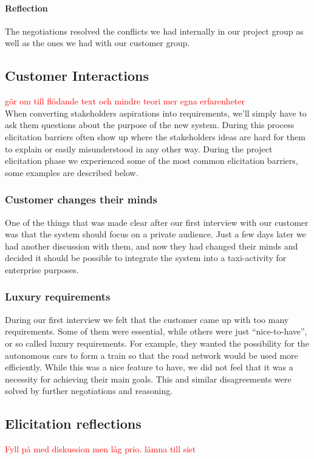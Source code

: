 \documentclass[10pt]{article}
\newcommand\todo[1]{\textcolor{red}{#1}}
\begin{document}
\paragraph{Reflection}
\hfill \break
The negotiations resolved the conflicts we had internally in our project group as well as the ones we had with our customer group.

\subsection{Customer Interactions}
\todo{gör om till flödande text och mindre teori mer egna erfarenheter}
\\
When converting stakeholders aspirations into requirements, we'll simply have to ask them questions about the purpose of the new system. During this process elicitation barriers often show up where the stakeholders ideas are hard for them to explain or easily misunderstood in any other way.
During the project elicitation phase we experienced some of the most common elicitation barriers, some examples are described below.

\subsubsection{Customer changes their minds}
One of the things that was made clear after our first interview with our customer was that the system should focus on a private audience. Just a few days later we had another discussion with them, and now they had changed their minds and decided it should be possible to integrate the system into a taxi-activity for enterprise purposes.

\subsubsection{Luxury requirements}
During our first interview we felt that the customer came up with too many requirements. Some of them were essential, while others were just “nice-to-have”, or so called luxury requirements. For example, they wanted the possibility for the autonomous cars to form a train so that the road network would be used more efficiently. While this was a nice feature to have, we did not feel that it was a necessity for achieving their main goals. This and similar disagreements were solved by further negotiations and reasoning. 

\subsection{Elicitation reflections}
\todo{Fyll på med diskussion men låg prio. lämna till sist}
\end{document}
